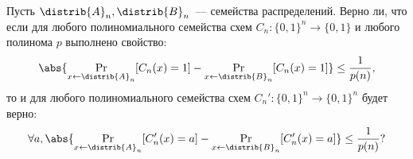 Пусть $\distrib{A}_n, \distrib{B}_n$~--- семейства распределений. Верно ли, что если для любого
полиномиального семейства схем $C_n\colon \{0, 1\}^{n} \to \{0, 1\}$ и любого полинома $p$ выполнено
свойство:
$$
    \abs{\Pr\limits_{x \gets \distrib{A}_n}[C_n(x) = 1] - \Pr\limits_{x \gets \distrib{B}_n}[C_n(x) = 1]}
    \le \frac{1}{p(n)}, 
$$
то и для любого полиномиального семейства схем $C_n'\colon \{0, 1\}^{n} \to \{0, 1\}^{n}$ будет верно:
$$
    \forall a,
    \abs{
        \Pr\limits_{x \gets \distrib{A}_n}[C_n'(x) = a] -
        \Pr\limits_{x \gets \distrib{B}_n}[C_n'(x) = a]
    } \le \frac{1}{p(n)}?
$$
